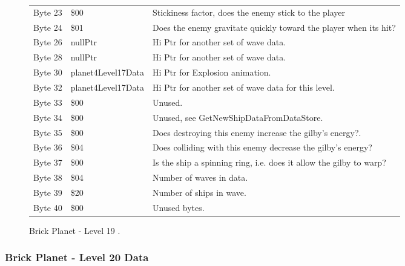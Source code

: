 \begin{figure}[H]
{\begin{adjustbox}{width=12cm}
\begin{tabular}{lll}
 Byte 23 & \$00                        & Stickiness factor, does the enemy stick to the player              \\
 Byte 24 & \$01                        & Does the enemy gravitate quickly toward the player when its hit?   \\
 Byte 26 & nullPtr                    & Hi Ptr for another set of wave data.                               \\
 Byte 28 & nullPtr                    & Hi Ptr for another set of wave data.                               \\
 Byte 30 & planet4Level17Data         & Hi Ptr for Explosion animation.                                    \\
 Byte 32 & planet4Level17Data         & Hi Ptr for another set of wave data for this level.                \\
 Byte 33 & \$00                        & Unused.                                                            \\
 Byte 34 & \$00                        & Unused, see GetNewShipDataFromDataStore.                           \\
 Byte 35 & \$00                        & Does destroying this enemy increase the gilby's energy?.           \\
 Byte 36 & \$04                        & Does colliding with this enemy decrease the gilby's energy?        \\
 Byte 37 & \$00                        & Is the ship a spinning ring, i.e. does it allow the gilby to warp? \\
 Byte 38 & \$04                        & Number of waves in data.                                           \\
 Byte 39 & \$20                        & Number of ships in wave.                                           \\
 Byte 40 & \$00                        & Unused bytes.                                                      \\
\bottomrule
\end{tabular}

  \end{adjustbox}

  }\caption*{Brick Planet - Level 19
.}
\end{figure}

\clearpage
\subsubsection{Brick Planet - Level 20 Data}

